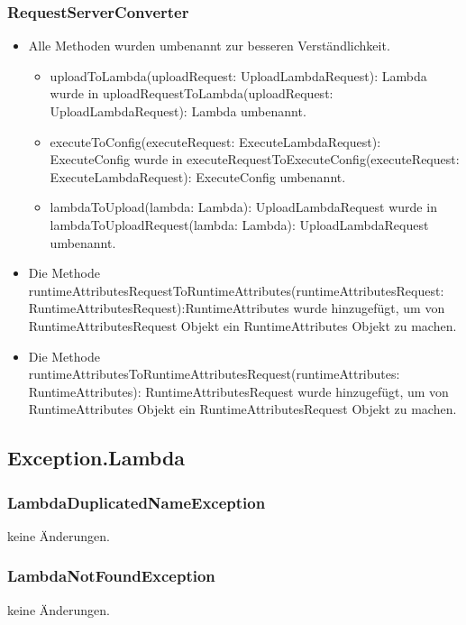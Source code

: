 \documentclass[a4paper,20pt,oneside]{book}
\begin{document}
	\subsubsection{RequestServerConverter}
	\begin{itemize}
	\item Alle Methoden wurden umbenannt zur besseren Verständlichkeit.\linebreak
	\begin{itemize}
    \item uploadToLambda(uploadRequest: UploadLambdaRequest): Lambda wurde in uploadRequestToLambda(uploadRequest: UploadLambdaRequest): Lambda umbenannt. \linebreak
    \item  executeToConfig(executeRequest: ExecuteLambdaRequest): ExecuteConfig wurde in executeRequestToExecuteConfig(executeRequest: ExecuteLambdaRequest): ExecuteConfig umbenannt. \linebreak
    \item  lambdaToUpload(lambda: Lambda): UploadLambdaRequest wurde in lambdaToUploadRequest(lambda: Lambda): UploadLambdaRequest umbenannt. \linebreak
    
	\end{itemize}
	\item Die Methode  runtimeAttributesRequestToRuntimeAttributes(runtimeAttributesRequest: RuntimeAttributesRequest):RuntimeAttributes wurde hinzugefügt, um von RuntimeAttributesRequest Objekt  ein RuntimeAttributes Objekt zu machen.\linebreak
	\item Die Methode  runtimeAttributesToRuntimeAttributesRequest(runtimeAttributes: RuntimeAttributes): RuntimeAttributesRequest wurde hinzugefügt, um von RuntimeAttributes Objekt  ein RuntimeAttributesRequest Objekt zu machen.\linebreak
	\end{itemize}
	
	\subsection{Exception.Lambda}
	\subsubsection{LambdaDuplicatedNameException}
	keine Änderungen.
	\subsubsection{LambdaNotFoundException}
	keine Änderungen.
\end{document}
